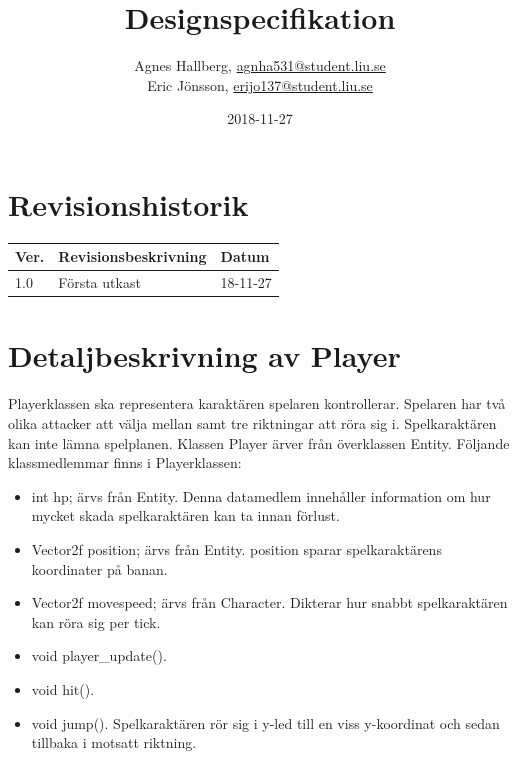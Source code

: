 \documentclass{TDP005mall}
\author{Agnes Hallberg, \url{agnha531@student.liu.se}\\
  Eric Jönsson, \url{erijo137@student.liu.se}}
\title{Designspecifikation}
\date{2018-11-27}
\begin{document}
\projectpage

\section*{Revisionshistorik}
\begin{table}[!h]
\begin{tabularx}{\linewidth}{|l|X|l|}
\hline
Ver. & Revisionsbeskrivning & Datum \\\hline
1.0 & Första utkast  & 18-11-27 \\\hline
\end{tabularx}
\end{table}

\section{Detaljbeskrivning av Player}
Playerklassen ska representera karaktären spelaren kontrollerar. Spelaren har två olika attacker att välja mellan samt tre riktningar att röra sig i. Spelkaraktären kan inte lämna spelplanen. Klassen Player ärver från överklassen Entity. Följande klassmedlemmar finns i Playerklassen:
\begin{itemize}
\item int hp; ärvs från Entity. Denna datamedlem innehåller information om hur mycket skada spelkaraktären kan ta innan förlust.
\item Vector2f position; ärvs från Entity. position sparar spelkaraktärens koordinater på banan.
\item Vector2f movespeed; ärvs från Character. Dikterar hur snabbt spelkaraktären kan röra sig per tick.
\item void player\_update().
\item void hit().
\item void jump(). Spelkaraktären rör sig i y-led till en viss y-koordinat och sedan tillbaka i motsatt riktning.
\end{itemize}
\end{document}
